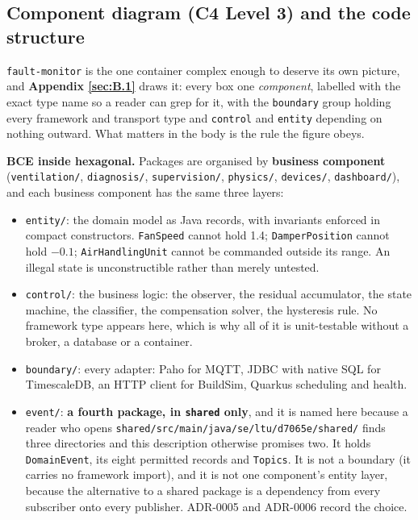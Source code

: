 \subsection{Component diagram (C4 Level 3) and the code structure}\label{sec:4.4}

\texttt{fault-monitor} is the one container complex enough to deserve its own picture, and
\textbf{Appendix \ref{sec:B.1}} draws it: every box one \emph{component}, labelled with the exact type name so
a reader can grep for it, with the \texttt{boundary} group holding every framework and transport type
and \texttt{control} and \texttt{entity} depending on nothing outward. What matters in the body is
the rule the figure obeys.


\textbf{BCE inside hexagonal.} Packages are organised by \textbf{business component}
(\texttt{ventilation/}, \texttt{diagnosis/}, \texttt{supervision/}, \texttt{physics/},
\texttt{devices/}, \texttt{dashboard/}), and each business component has the same three layers:

\begin{itemize}
\tightlist
\item \texttt{entity/}: the domain model as Java records, with invariants enforced in compact
  constructors. \texttt{FanSpeed} cannot hold 1.4; \texttt{DamperPosition} cannot hold $-0.1$;
  \texttt{AirHandlingUnit} cannot be commanded outside its range. An illegal state is
  unconstructible rather than merely untested.
\item \texttt{control/}: the business logic: the observer, the residual accumulator, the state
  machine, the classifier, the compensation solver, the hysteresis rule. No framework type appears
  here, which is why all of it is unit-testable without a broker, a database or a container.
\item \texttt{boundary/}: every adapter: Paho for MQTT, JDBC with native SQL for TimescaleDB, an
  HTTP client for BuildSim, Quarkus scheduling and health.
\item \texttt{event/}: \textbf{a fourth package, in \texttt{shared} only}, and it is named here
  because a reader who opens \texttt{shared/src/main/java/se/ltu/d7065e/shared/} finds three
  directories and this description otherwise promises two. It holds \texttt{DomainEvent}, its eight
  permitted records and \texttt{Topics}. It is not a boundary (it carries no framework import),
  and it is not one component's entity layer, because the alternative to a shared package is a
  dependency from every subscriber onto every publisher. ADR-0005 and ADR-0006 record the choice.
\end{itemize}

